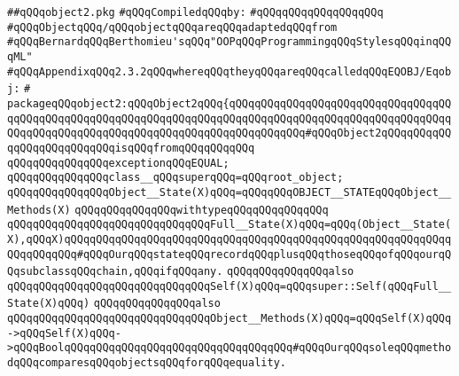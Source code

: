 \label{src/lib/src/object2.pkg}
\verb|##qQQqobject2.pkg|\newline
\newline
\verb|#qQQqCompiledqQQqby:|\newline
\verb|#qQQqqQQqqQQqqQQqqQQq|\newline
\newline
\verb|#qQQqObjectqQQq/qQQqobjectqQQqareqQQqadaptedqQQqfrom|\newline
\verb|#qQQqBernardqQQqBerthomieu'sqQQq"OOPqQQqProgrammingqQQqStylesqQQqinqQQqML"|\newline
\verb|#qQQqAppendixqQQq2.3.2qQQqwhereqQQqtheyqQQqareqQQqcalledqQQqEQOBJ/Eqobj:|\newline
\verb|#|\newline
\verb|packageqQQqobject2:qQQqObject2qQQq{qQQqqQQqqQQqqQQqqQQqqQQqqQQqqQQqqQQqqQQqqQQqqQQqqQQqqQQqqQQqqQQqqQQqqQQqqQQqqQQqqQQqqQQqqQQqqQQqqQQqqQQqqQQqqQQqqQQqqQQqqQQqqQQqqQQqqQQqqQQqqQQqqQQqqQQq#qQQqObject2qQQqqQQqqQQqqQQqqQQqqQQqqQQqisqQQqfromqQQqqQQqqQQq|\newline
\newline
\verb|qQQqqQQqqQQqqQQqexceptionqQQqEQUAL;|\newline
\newline
\verb|qQQqqQQqqQQqqQQqclass__qQQqsuperqQQq=qQQqroot_object;|\newline
\newline
\verb|qQQqqQQqqQQqqQQqObject__State(X)qQQq=qQQqqQQqOBJECT__STATEqQQqObject__Methods(X)|\newline
\verb|qQQqqQQqqQQqqQQqwithtypeqQQqqQQqqQQqqQQq|\newline
\verb|qQQqqQQqqQQqqQQqqQQqqQQqqQQqqQQqFull__State(X)qQQq=qQQq(Object__State(X),qQQqX)qQQqqQQqqQQqqQQqqQQqqQQqqQQqqQQqqQQqqQQqqQQqqQQqqQQqqQQqqQQqqQQqqQQqqQQq#qQQqOurqQQqstateqQQqrecordqQQqplusqQQqthoseqQQqofqQQqourqQQqsubclassqQQqchain,qQQqifqQQqany.|\newline
\verb|qQQqqQQqqQQqqQQqalso|\newline
\verb|qQQqqQQqqQQqqQQqqQQqqQQqqQQqqQQqSelf(X)qQQq=qQQqsuper::Self(qQQqFull__State(X)qQQq)|\newline
\verb|qQQqqQQqqQQqqQQqalso|\newline
\verb|qQQqqQQqqQQqqQQqqQQqqQQqqQQqqQQqObject__Methods(X)qQQq=qQQqSelf(X)qQQq->qQQqSelf(X)qQQq->qQQqBoolqQQqqQQqqQQqqQQqqQQqqQQqqQQqqQQqqQQq#qQQqOurqQQqsoleqQQqmethodqQQqcomparesqQQqobjectsqQQqforqQQqequality.|\newline

